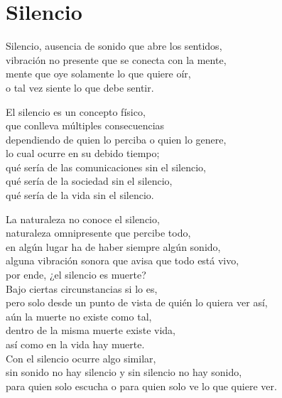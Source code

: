 \section*{Silencio}
\label{Silencio}

\vspace{1em}
\begin{center}
Silencio, ausencia de sonido que abre los sentidos,\\
vibración no presente que se conecta con la mente,\\
mente que oye solamente lo que quiere oír,\\
o tal vez siente lo que debe sentir.

\vspace{1em}
El silencio es un concepto físico,\\ 
que conlleva múltiples consecuencias\\
dependiendo de quien lo perciba o quien lo genere,\\
lo cual ocurre en su debido tiempo;\\
qué sería de las comunicaciones sin el silencio,\\
qué sería de la sociedad sin el silencio,\\
qué sería de la vida sin el silencio.

\vspace{1em}
La naturaleza no conoce el silencio,\\
naturaleza omnipresente que percibe todo,\\
en algún lugar ha de haber siempre algún sonido,\\
alguna vibración sonora que avisa que todo está vivo,\\
por ende, ¿el silencio es muerte?\\
Bajo ciertas circunstancias si lo es,\\
pero solo desde un punto de vista de quién lo quiera ver así,\\
aún la muerte no existe como tal,\\
dentro de la misma muerte existe vida,\\
así como en la vida hay muerte.\\
Con el silencio ocurre algo similar,\\
sin sonido no hay silencio y sin silencio no hay sonido,\\
para quien solo escucha o para quien solo ve lo que quiere ver.


\end{center}
